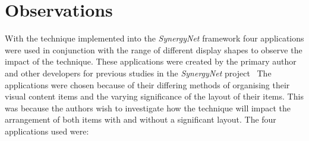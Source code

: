 \documentclass{bmcart}
\begin{document}
\section*{Observations}
\label{sec:observations}

With the technique implemented into the {\emph{SynergyNet}} framework four applications were used in conjunction with the range of different display shapes to observe the impact of the technique.
These applications were created by the primary author and other developers for previous studies in the {\emph{SynergyNet}} project~\cite{higgins2011}
The applications were chosen because of their differing methods of organising their visual content items and the varying significance of the layout of their items.
This was because the authors wish to investigate how the technique will impact the arrangement of both items with and without a significant layout.
The four applications used were:
\end{document}
